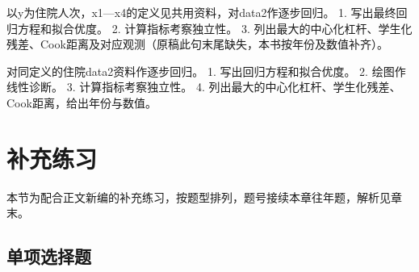 \par\addvspace{6pt}\noindent\begin{minipage}{\linewidth}


以y为住院人次，x1---x4的定义见共用资料，对data2作逐步回归。 1. 写出最终回归方程和拟合优度。 2. 计算指标考察独立性。 3. 列出最大的中心化杠杆、学生化残差、Cook距离及对应观测（原稿此句末尾缺失，本书按年份及数值补齐）。



\end{minipage}\par\vspace{4pt}

\par\addvspace{6pt}\noindent\begin{minipage}{\linewidth}


对同定义的住院data2资料作逐步回归。 1. 写出回归方程和拟合优度。 2. 绘图作线性诊断。 3. 计算指标考察独立性。 4. 列出最大的中心化杠杆、学生化残差、Cook距离，给出年份与数值。



\end{minipage}\par\vspace{4pt}



\clearpage\section{补充练习}

本节为配合正文新编的补充练习，按题型排列，题号接续本章往年题，解析见章末。

\subsection{单项选择题}

